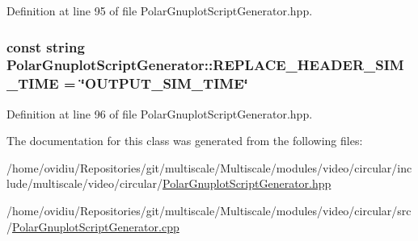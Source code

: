 \-Definition at line 95 of file \-Polar\-Gnuplot\-Script\-Generator.\-hpp.

\hypertarget{classmultiscale_1_1video_1_1PolarGnuplotScriptGenerator_ab06a56e8ac6c117d9a3d1279bd114941}{
\subsubsection[{\-R\-E\-P\-L\-A\-C\-E\-\_\-\-H\-E\-A\-D\-E\-R\-\_\-\-S\-I\-M\-\_\-\-T\-I\-M\-E}]{\setlength{\rightskip}{0pt plus 5cm}const string {\bf \-Polar\-Gnuplot\-Script\-Generator\-::\-R\-E\-P\-L\-A\-C\-E\-\_\-\-H\-E\-A\-D\-E\-R\-\_\-\-S\-I\-M\-\_\-\-T\-I\-M\-E} = \char`\"{}\-O\-U\-T\-P\-U\-T\-\_\-\-S\-I\-M\-\_\-\-T\-I\-M\-E\char`\"{}}}\label{classmultiscale_1_1video_1_1PolarGnuplotScriptGenerator_ab06a56e8ac6c117d9a3d1279bd114941}


\-Definition at line 96 of file \-Polar\-Gnuplot\-Script\-Generator.\-hpp.



\-The documentation for this class was generated from the following files\-:\begin{DoxyCompactItemize}
\item 
/home/ovidiu/\-Repositories/git/multiscale/\-Multiscale/modules/video/circular/include/multiscale/video/circular/\hyperlink{PolarGnuplotScriptGenerator_8hpp}{\-Polar\-Gnuplot\-Script\-Generator.\-hpp}\item 
/home/ovidiu/\-Repositories/git/multiscale/\-Multiscale/modules/video/circular/src/\hyperlink{PolarGnuplotScriptGenerator_8cpp}{\-Polar\-Gnuplot\-Script\-Generator.\-cpp}\end{DoxyCompactItemize}
